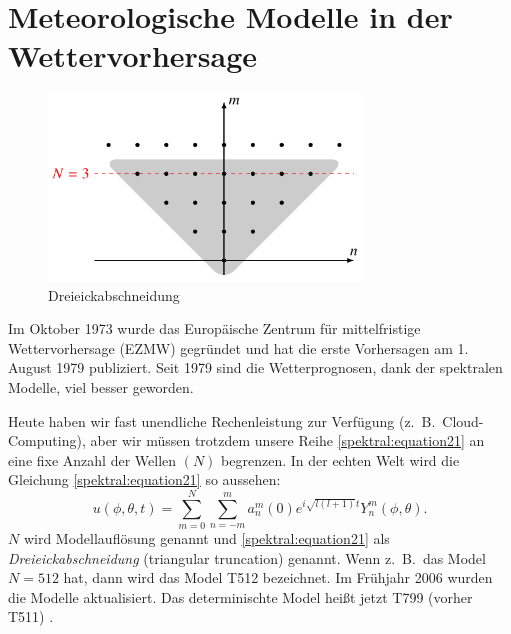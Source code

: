 %
%
%
%
\section{Meteorologische Modelle in der Wettervorhersage
\label{spektral:section:modelle}}
\begin{figure}
	\centering
	\includegraphics[height=140pt]{papers/spektral/images/triangle_truncation.pdf}
	\caption{Dreieickabschneidung}
    \label{spektral:fig:triangletrunc}
\end{figure}

Im Oktober 1973 wurde das Europäische Zentrum für mittelfristige Wettervorhersage (EZMW) gegründet \cite{spektral:ezmw} und hat die erste Vorhersagen am 1. August 1979 publiziert.
%
%
Seit 1979 sind die Wetterprognosen, dank der spektralen Modelle, viel besser geworden.

Heute haben wir fast unendliche Rechenleistung zur Verfügung (z.~B.~Cloud-Computing), aber wir müssen trotzdem unsere Reihe \eqref{spektral:equation21} an eine fixe Anzahl der Wellen $(N)$ begrenzen.
%
In der echten Welt wird die Gleichung \eqref{spektral:equation21} so aussehen:
\begin{equation}
u(\phi, \theta, t) = \sum_{m=0}^{N}\sum_{n=-m}^{m}a_n^m(0)e^{i\sqrt{l(l+1)}t}Y_n^m(\phi, \theta).
\label{spektral:equation22}
\end{equation}
$N$ wird Modellauflösung genannt \cite[Seite 223]{spektral:NumericalWeatherPrediction} und \eqref{spektral:equation21} als {\em Dreieickabschneidung} (triangular truncation) genannt.
%
%
Wenn
z.~B.~das Model $N = 512$ hat, dann wird das Model T512 bezeichnet. 
Im Frühjahr 2006 wurden die Modelle aktualisiert. Das determinischte Model heißt jetzt T799 (vorher T511) \cite[Seite 222]{spektral:NumericalWeatherPrediction}.

